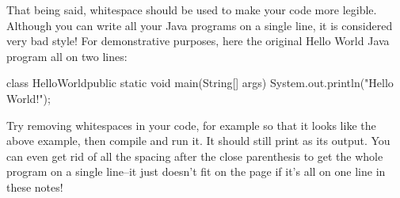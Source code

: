 That being said, whitespace should be used to make your code more legible. Although you can write
all your Java programs on a single line, it is considered very bad style!
For demonstrative purposes, here the original Hello World Java program all on two lines:
\begin{code}
class HelloWorld{public static void main(String[] args)
    {System.out.println("Hello World!");}}
\end{code}
Try removing whitespaces in your code, for example so that it looks like the above example, then compile and run it. It should still print  as its output.
You can even get rid of all the spacing after the close parenthesis \ic{)} to get the whole program on a single line--it
just doesn't fit on the page if it's all on one line in these notes!

